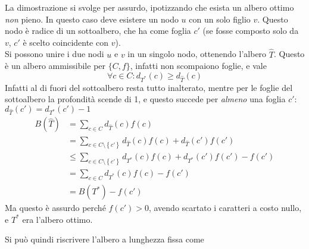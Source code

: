 La dimostrazione si svolge per assurdo, ipotizzando che esista un albero ottimo \emph{non} pieno. In questo caso deve esistere un nodo $u$ con un solo figlio $v$. Questo nodo è radice di un sottoalbero, che ha come foglia $c'$ (se fosse composto solo da $v$, $c'$ è scelto coincidente con $v$).
\\
Si possono unire i due nodi $u$ e $v$ in un singolo nodo, ottenendo l'albero $\widehat{T}$. Questo è un albero ammissibile per $\{C,f\}$, infatti non scompaiono foglie, e vale
\begin{equation*}
    \forall c \in C : d_{T^*} (c) \geq d_{\widehat{T}} (c)
\end{equation*}
Infatti al di fuori del sottoalbero resta tutto inalterato, mentre per le foglie del sottoalbero la profondità scende di 1, e questo succede per \emph{almeno} una foglia $c'$: $d_{\widehat{T}} (c') = d_{T^*} (c') -1$
\begin{align*}
    B \left( \widehat{T} \right)
    &= \sum_{c \in C} d_{\widehat{T}} (c) f(c) \\
    &= \sum_{c \in C \setminus \left\{ c' \right\}} d_{\widehat{T}} (c) f(c) + d_{\widehat{T}} (c') f(c') \\
    &\leq \sum_{c \in C \setminus \left\{ c' \right\}} d_{T^*} (c) f(c) 
    + d_{T^*} (c') f(c') - f(c') \\
    &= \sum_{c \in C} d_{T^*} (c) f(c) - f(c') \\
    &= B \left( T^* \right) - f(c')
\end{align*}
Ma questo è assurdo perché $f(c')>0$, avendo scartato i caratteri a costo nullo, e $T^*$ era l'albero ottimo.

Si può quindi riscrivere l'albero a lunghezza fissa come

